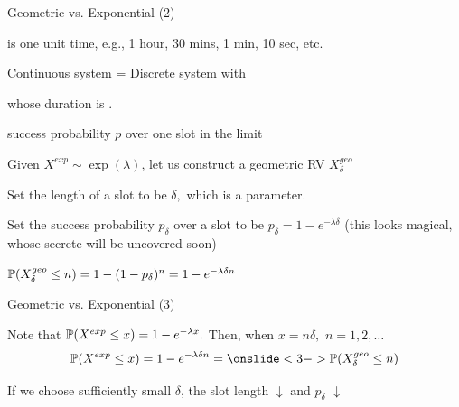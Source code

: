 \begin{frame}{Geometric vs. Exponential (2)}

\plitemsep 0.1in
\bci

\item {} is one unit time, e.g., 1 hour, 30 mins, 1 min, 10 sec, etc.

\item<2-> Continuous system = Discrete system with
\bci
\item {} whose duration is .
\item success probability $p$ over one slot  in the limit
\eci

\item<3-> Given $X^{exp} \sim \exp(\lambda)$, let us construct a geometric RV $X^{geo}_\delta$

\bci
\item<4-> Set the length of a slot to be $\delta,$ which is a parameter.
\item<5-> Set the success probability $p_\delta$ over a slot to be $p_\delta = 1 - e^{-\lambda \delta}$ (this looks magical, whose secrete will be uncovered soon)
\item<6-> $\mathbb{P}( X^{geo}_\delta \leq n ) = 1-(1-p_\delta)^n = 1- e^{-\lambda \delta n}$
\eci
\eci
\end{frame}

\begin{frame}{Geometric vs. Exponential (3)}


\vspace{-0.5cm}
\plitemsep 0.07in
\bci

\item<2-> Note that $\mathbb{P}( X^{exp} \leq x ) = 1- e^{-\lambda x}.$ Then, when $x = n\delta,$ $n=1, 2, \ldots$
$$
\cprob{X^{exp} \leq x} = 1- e^{-\lambda \delta n} = \onslide<3->{\cprob{X^{geo}_\delta \leq n} }
$$

\item<4-> If we choose sufficiently small $\delta$, the slot length $\downarrow$ and $p_\delta$ $\downarrow$
\eci

\end{frame}

